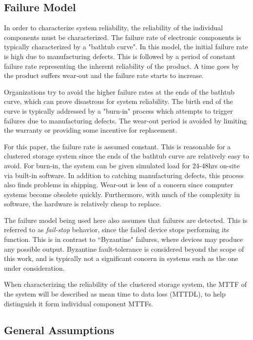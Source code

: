 \documentclass[11pt]{article}
\numberwithin{equation}{section}
\begin{document}
\subsection{Failure Model}

In order to characterize system reliability, the reliability of the individual
components must be characterized.  The failure rate of electronic components
is typically characterized by a "bathtub curve".  In this model, the initial
failure rate is high due to manufacturing defects.  This is followed by a
period of constant failure rate representing the inherent reliability of the
product.  A time goes by the product suffers wear-out and the failure rate
starts to increase.

Organizations try to avoid the higher failure rates at the ends of the bathtub
curve, which can prove disastrous for system reliability.  The birth end of
the curve is typically addressed by a "burn-in" process which attempts to
trigger failures due to manufacturing defects.  The wear-out period is avoided
by limiting the warranty or providing some incentive for replacement.

For this paper, the failure rate is assumed constant.  This is reasonable for
a clustered storage system since the ends of the bathtub curve are relatively
easy to avoid.  For burn-in, the system can be given simulated load for
24-48hrs on-site via built-in software.  In addition to catching manufacturing
defects, this process also finds problems in shipping.  Wear-out is less of a
concern since computer systems become obsolete quickly.  Furthermore, with much
of the complexity in software, the hardware is relatively cheap to replace.

The failure model being used here also assumes that failures are detected.
This is referred to as {\em fail-stop} behavior, since the failed device
stops performing its function.  This is in contrast to ``Byzantine" failures,
where devices may produce any possible output.  Byzantine fault-tolerance is
considered beyond the scope of this work, and is typically not a significant
concern in systems such as the one under consideration.

When characterizing the reliability of the clustered storage system, the MTTF
of the system will be described as mean time to data loss (MTTDL), to help
distinguish it form individual component MTTFs.

\subsection{General Assumptions}
\end{document}
